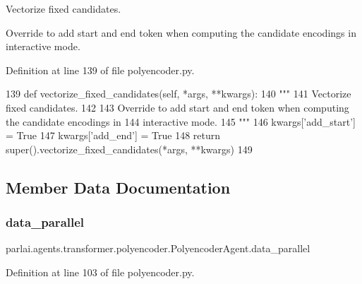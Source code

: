 \begin{DoxyVerb}Vectorize fixed candidates.

Override to add start and end token when computing the candidate encodings in
interactive mode.
\end{DoxyVerb}
 

Definition at line 139 of file polyencoder.\+py.


\begin{DoxyCode}
139     \textcolor{keyword}{def }vectorize\_fixed\_candidates(self, *args, **kwargs):
140         \textcolor{stringliteral}{"""}
141 \textcolor{stringliteral}{        Vectorize fixed candidates.}
142 \textcolor{stringliteral}{}
143 \textcolor{stringliteral}{        Override to add start and end token when computing the candidate encodings in}
144 \textcolor{stringliteral}{        interactive mode.}
145 \textcolor{stringliteral}{        """}
146         kwargs[\textcolor{stringliteral}{'add\_start'}] = \textcolor{keyword}{True}
147         kwargs[\textcolor{stringliteral}{'add\_end'}] = \textcolor{keyword}{True}
148         \textcolor{keywordflow}{return} super().vectorize\_fixed\_candidates(*args, **kwargs)
149 
\end{DoxyCode}


\subsection{Member Data Documentation}
\mbox{\label{classparlai_1_1agents_1_1transformer_1_1polyencoder_1_1PolyencoderAgent_a7b415240e04df392cb8767911fc0ff68}} 
\subsubsection{\texorpdfstring{data\+\_\+parallel}{data\_parallel}}
{\footnotesize\ttfamily parlai.\+agents.\+transformer.\+polyencoder.\+Polyencoder\+Agent.\+data\+\_\+parallel}



Definition at line 103 of file polyencoder.\+py.


